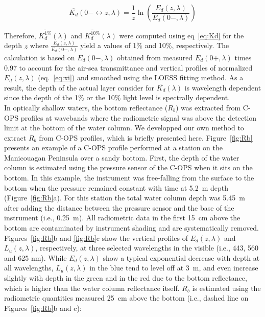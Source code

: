 \documentclass[essd, manuscript]{copernicus}
\begin{document}
\begin{equation}
    \overline{K_d}(0- \leftrightarrow z, \lambda) = \frac{1}{z}\ln \left( \frac{E_d(z, \lambda)}{E_d(0-, \lambda)} \right)
    \label{eq:Kd}
\end{equation}

Therefore, $\overline{K_d^{1\%}}(\lambda)$ and $\overline{K_d^{10\%}}(\lambda)$ were computed using eq~\ref{eq:Kd} for the depth $z$ where $\frac{E_d(z,\lambda)}{E_d(0-, \lambda)}$ yield a values of 1\% and 10\%, respectively. The calculation is based on $E_d(0-, \lambda)$ obtained from measured $E_d(0+, \lambda)$ times 0.97 to account for the air-sea transmittance \citep{Mueller2003} and vertical profiles of normalized $E_d(z, \lambda)$ (eq.~\ref{eq:xi}) and smoothed using the LOESS fitting method. As a result, the depth of the actual layer consider for $\overline{K_d}(\lambda)$ is wavelength dependent since the depth of the 1\% or the 10\% light level is spectrally dependent. \\ 

In optically shallow waters, the bottom reflectance ($R_b$) was extracted from C-OPS profiles at wavebands where the radiometric signal was above the detection limit at the bottom of the water column. We developped our own method to extract $R_b$ from C-OPS profiles, which is briefly presented here.   Figure~\ref{fig:Rb} presents an example of a C-OPS profile performed at a station on the Manicouagan Peninsula over a sandy bottom. First, the depth of the water column is estimated using the pressure sensor of the C-OPS when it sits on the bottom. In this example, the instrument was free-falling from the surface to the bottom when the pressure remained constant with time at 5.2~m depth (Figure~\ref{fig:Rb}a). For this station the total water column depth was 5.45~m after adding the distance between the pressure sensor and the base of the instrument (i.e., 0.25~m). All radiometric data in the first 15~cm above the bottom are contaminated by instrument shading and are systematically removed. Figures~\ref{fig:Rb}b and \ref{fig:Rb}c show the vertical profiles of $E_d(z, \lambda)$ and $L_u(z, \lambda)$, respectively, at three selected wavelengths in the visible (i.e., 443, 560 and 625 nm). While $E_d(z, \lambda)$ show a typical exponential decrease with depth at all wavelengths,  $L_u(z, \lambda)$ in the blue tend to level off at 3~m, and even increase slightly with depth in the green and in the red due to the bottom reflectance, which is higher than the water column reflectance itself. $R_b$ is estimated using the radiometric quantities measured 25~cm above the bottom (i.e., dashed line on Figures~\ref{fig:Rb}b and c):
\end{document}
